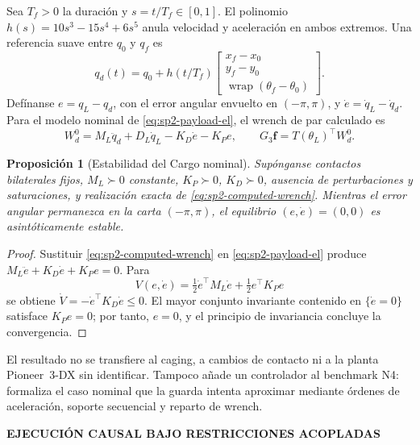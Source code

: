 \documentclass[12pt,a4paper]{article}
\newcommand{\leveltag}[1]{%
  \Needspace{5.5\baselineskip}%
  \noindent\colorbox{VIUDark}{%
    \parbox{\dimexpr\textwidth-2\fboxsep\relax}{%
      \color{white}\sffamily\bfseries\small #1%
    }%
  }\par\smallskip
}
\newtheorem{sp2prop}{Proposición}
\begin{document}
Sea $T_f>0$ la duración y $s=t/T_f\in[0,1]$. El polinomio
$h(s)=10s^3-15s^4+6s^5$ anula velocidad y aceleración en ambos extremos. Una
referencia suave entre $q_0$ y $q_f$ es
\begin{equation}
q_d(t)=q_0+h(t/T_f)
\begin{bmatrix}
x_f-x_0\\ y_f-y_0\\
\operatorname{wrap}(\theta_f-\theta_0)
\end{bmatrix}.
\label{eq:sp2-quintic-reference}
\end{equation}
Defínanse $e=q_L-q_d$, con el error angular envuelto en $(-\pi,\pi)$, y
$\dot e=\dot q_L-\dot q_d$. Para el modelo nominal de
\eqref{eq:sp2-payload-el}, el wrench de par calculado es
\begin{equation}
W_d^0=M_L\ddot q_d+D_L\dot q_L-K_D\dot e-K_Pe,
\qquad G_3\mathbf f=T(\theta_L)^\top W_d^0.
\label{eq:sp2-computed-wrench}
\end{equation}

\begin{sp2prop}[Estabilidad del Cargo nominal]
Supónganse contactos bilaterales fijos, $M_L\succ0$ constante,
$K_P\succ0$, $K_D\succ0$, ausencia de perturbaciones y saturaciones, y
realización exacta de \eqref{eq:sp2-computed-wrench}. Mientras el error angular
permanezca en la carta $(-\pi,\pi)$, el equilibrio $(e,\dot e)=(0,0)$ es
asintóticamente estable.
\end{sp2prop}
\begin{proof}
Sustituir \eqref{eq:sp2-computed-wrench} en
\eqref{eq:sp2-payload-el} produce
$M_L\ddot e+K_D\dot e+K_Pe=0$. Para
\begin{equation}
V(e,\dot e)=\tfrac12\dot e^\top M_L\dot e+
\tfrac12e^\top K_Pe
\label{eq:sp2-cargo-lyapunov}
\end{equation}
se obtiene $\dot V=-\dot e^\top K_D\dot e\leq0$. El mayor conjunto invariante
contenido en $\{\dot e=0\}$ satisface $K_Pe=0$; por tanto, $e=0$, y el principio
de invariancia concluye la convergencia.
\end{proof}

El resultado no se transfiere al caging, a cambios de contacto ni a la planta
Pioneer~3-DX sin identificar. Tampoco añade un controlador al benchmark N4:
formaliza el caso nominal que la guarda intenta aproximar mediante órdenes de
aceleración, soporte secuencial y reparto de wrench.

\leveltag{EJECUCIÓN CAUSAL BAJO RESTRICCIONES ACOPLADAS}
\end{document}
